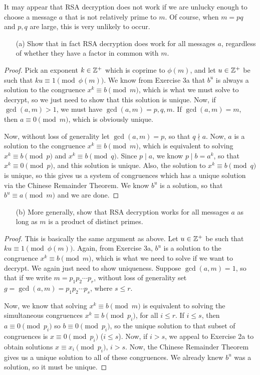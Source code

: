\documentclass{article}
\begin{document}
\begin{exercise}[Chapter 18, \#2]
It may appear that RSA decryption does not work if we are unlucky enough to choose a message $a$ that is not relatively prime to $m$. Of course, when $m=pq$ and $p,q$ are large, this is very unlikely to occur.
\begin{itemize}
    \item[(a)] Show that in fact RSA decryption does work for all messages $a$, regardless of whether they have a factor in common with $m$.
\end{itemize}
\begin{proof}
Pick an exponent $k\in\mathbb Z^+$ which is coprime to $\phi(m)$, and let $u\in\mathbb Z^+$ be such that $ku\equiv 1\pmod{\phi(m)}$. We know from Exercise 3a that $b^u$ is always a solution to the congruence $x^k\equiv b\pmod m$, which is what we must solve to decrypt, so we just need to show that this solution is unique. Now, if $\gcd(a,m) > 1$, we must have $\gcd(a,m) = p,q,m$. If $\gcd(a,m) = m$, then $a\equiv 0\pmod m$, which is obviously unique.

Now, without loss of generality let $\gcd(a, m) = p$, so that $q\nmid a$. Now, $a$ is a solution to the congruence $x^k \equiv b\pmod m$, which is equivalent to solving $x^k\equiv b\pmod p$ and $x^k\equiv b\pmod q$. Since $p\mid a$, we know $p\mid b = a^k$, so that $x^k\equiv 0\pmod p$, and this solution is unique. Also, the solution to $x^k\equiv b\pmod q$ is unique, so this gives us a system of congruences which has a unique solution via the Chinese Remainder Theorem. We know $b^u$ is a solution, so that $b^u \equiv a\pmod m$ and we are done.
\end{proof}

\newpage
\begin{itemize}
    \item[(b)] More generally, show that RSA decryption works for all messages $a$ as long as $m$ is a product of distinct primes.
\end{itemize}
\begin{proof}
This is basically the same argument as above. Let $u\in\mathbb Z^+$ be such that $ku\equiv 1\pmod{\phi(m)}$. Again, from Exercise 3a, $b^u$ is a solution to the congruence $x^k \equiv b \pmod{m}$, which is what we need to solve if we want to decrypt. We again just need to show uniqueness. Suppose $\gcd(a,m) = 1$, so that if we write $m = p_1p_2\cdots p_r$, without loss of generality set $g = \gcd(a, m) = p_1p_2\cdots p_s$, where $s\leq r$. 

Now, we know that solving $x^k\equiv b\pmod m$ is equivalent to solving the simultaneous congruences $x^k \equiv b\pmod{p_i}$, for all $i\leq r$. If $i\leq s$, then $a \equiv 0\pmod{p_i}$ so $b\equiv 0\pmod{p_i}$, so the unique solution to that subset of congruences is $x\equiv 0\pmod{p_i}$ ($i\leq s$). Now, if $i > s$, we appeal to Exercise 2a to obtain solutions $x \equiv x_i \pmod{p_i}$, $i>s$. Now, the Chinese Remainder Theorem gives us a unique solution to all of these congruences. We already knew $b^{u}$ was a solution, so it must be unique.
\end{proof}


\end{exercise}
\end{document}
